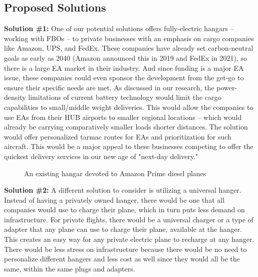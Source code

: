 \documentclass[../main.tex]{subfiles}
\begin{document}
\newpage
\subsection{Proposed Solutions}
\noindent\textbf{Solution \#1:}\newline
\indent One of our potential solutions offers fully-electric hangars -- working with FBOs -- to private businesses with an emphasis on cargo companies like Amazon, UPS, and FedEx. These companies have already set carbon-neutral goals as early as 2040 (Amazon announced this in 2019 and FedEx in 2021), so there is a large EA market in their industry. And since funding is a major EA issue, these companies could even sponsor the development from the get-go to ensure their specific needs are met. As discussed in our research, the power-density limitations of current battery technology would limit the cargo capabilities to small/middle weight deliveries. This would allow the companies to use EAs from their HUB airports to smaller regional locations -- which would already be carrying comparatively smaller loads shorter distances. The solution would offer personalized tarmac routes for EAs and prioritization for such aircraft. This would be a major appeal to these businesses competing to offer the quickest delivery services in our new age of "next-day delivery." \par
\begin{figure}[h!]
    \centering
    \caption{An existing hangar devoted to Amazon Prime diesel planes}
    \centering
\end{figure}
\newpage
\noindent\textbf{Solution \#2:}\newline
\indent A different solution to consider is utilizing a universal hanger. Instead of having a privately owned hanger, there would be one that all companies would use to charge their plane, which in turn puts less demand on infrastructure. For private flights, there would be a universal charger or a type of adapter that any plane can use to charge their plane, available at the hanger. This creates an easy way for any private electric plane to recharge at any hanger. There would be less stress on infrastructure because there would be no need to personalize different hangers and less cost as well since they would all be the same, within the same plugs and adapters. \par
\end{document}

